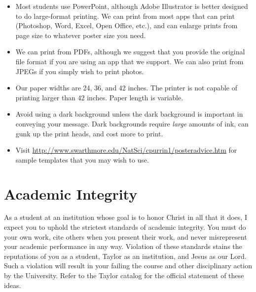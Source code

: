 \documentclass{article}
\begin{document}
\begin{itemize}
\item Most students use PowerPoint, although Adobe Illustrator is better designed to do
large-format printing. We can print from most apps that can print (Photoshop, Word,
Excel, Open Office, etc.), and can enlarge prints from page size to whatever poster size
you need.
\item We can print from PDFs, although we suggest that you provide the original file format if
you are using an app that we support. We can also print from JPEGs if you simply wish to
print photos.
\item Our paper widths are 24, 36, and 42 inches. The printer is not capable of printing
larger than 42 inches. Paper length is variable.
\item Avoid using a dark background unless the dark background is important in conveying your
message. Dark backgrounds require \emph{large} amounts of ink, can gunk up the print heads,
and cost more to print.
\item Visit \url{http://www.swarthmore.edu/NatSci/cpurrin1/posteradvice.htm} for sample templates
that you may wish to use.
\end{itemize}
\section{Academic Integrity}
\label{sec:orgheadline20}
As a student at an institution whose goal is to honor Christ in all that it does, I expect
you to uphold the strictest standards of academic integrity. You must do your own work,
cite others when you present their work, and never misrepresent your academic performance
in any way. Violation of these standards stains the reputations of you as a student,
Taylor as an institution, and Jesus as our Lord. Such a violation will result in your
failing the course and other disciplinary action by the University. Refer to the Taylor
catalog for the official statement of these ideas.
\end{document}
